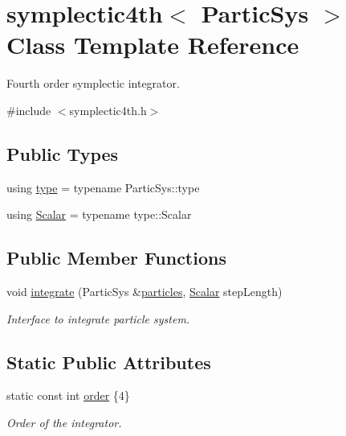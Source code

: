 \hypertarget{classsymplectic4th}{}\section{symplectic4th$<$ Partic\+Sys $>$ Class Template Reference}
\label{classsymplectic4th}


Fourth order symplectic integrator.  




{\ttfamily \#include $<$symplectic4th.\+h$>$}

\subsection*{Public Types}
\begin{DoxyCompactItemize}
\item 
using \mbox{\hyperlink{classsymplectic4th_a5af1033b30e95ca0d08ee8f3c0adabc2}{type}} = typename Partic\+Sys\+::type
\item 
using \mbox{\hyperlink{classsymplectic4th_a272a5a2bb16a90a7ebdad0335a2fac9b}{Scalar}} = typename type\+::\+Scalar
\end{DoxyCompactItemize}
\subsection*{Public Member Functions}
\begin{DoxyCompactItemize}
\item 
void \mbox{\hyperlink{classsymplectic4th_a4ec2375bddd7b3cdff6c675e14a08fe0}{integrate}} (Partic\+Sys \&\mbox{\hyperlink{classparticles}{particles}}, \mbox{\hyperlink{classsymplectic4th_a272a5a2bb16a90a7ebdad0335a2fac9b}{Scalar}} step\+Length)
\begin{DoxyCompactList}\small\item\em Interface to integrate particle system. \end{DoxyCompactList}\end{DoxyCompactItemize}
\subsection*{Static Public Attributes}
\begin{DoxyCompactItemize}
\item 
static const int \mbox{\hyperlink{classsymplectic4th_a44427b7e9dab1a2241071d1cc639ebe4}{order}} \{4\}
\begin{DoxyCompactList}\small\item\em Order of the integrator. \end{DoxyCompactList}\end{DoxyCompactItemize}


